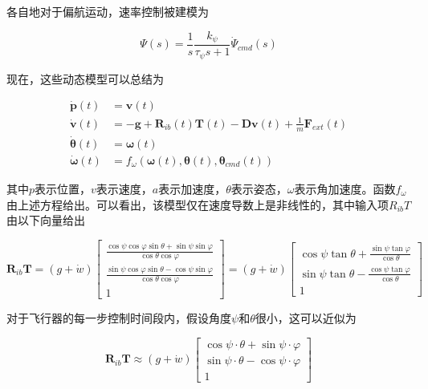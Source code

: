 各自地对于偏航运动，速率控制被建模为

\begin{equation}
\Psi(s)=\frac{1}{s} \frac{k_{\psi}}{\tau_{\psi} s+1} \dot{\Psi}_{c m d}(s)
\end{equation}

现在，这些动态模型可以总结为

\begin{equation}
\begin{aligned}
\dot{\boldsymbol{p}}(t) &=\boldsymbol{v}(t) \\
\dot{\boldsymbol{v}}(t) &=-\boldsymbol{g}+\boldsymbol{R}_{i b}(t) \boldsymbol{T}(t)-\boldsymbol{D} \boldsymbol{v}(t)+\frac{1}{m} \boldsymbol{F}_{e x t}(t) \\
\dot{\boldsymbol{\theta}}(t) &=\boldsymbol{\omega}(t) \\
\dot{\boldsymbol{\omega}}(t) &=f_{\omega}\left(\boldsymbol{\omega}(t), \boldsymbol{\theta}(t), \boldsymbol{\theta}_{c m d}(t)\right)
\end{aligned}
\end{equation}

其中$p$表示位置，$v$表示速度，$a$表示加速度，$\theta$表示姿态，$\omega$表示角加速度。函数$f_{\omega}$由上述方程给出。可以看出，该模型仅在速度导数上是非线性的，其中输入项$R_{ib}T$由以下向量给出

\begin{equation}
\boldsymbol{R}_{i b} \boldsymbol{T}=(g+\dot{w})\left[\begin{array}{c}
\frac{\cos \psi \cos \varphi \sin \theta+\sin \psi \sin \varphi}{\cos \theta \cos \varphi} \\
\frac{\sin \psi \cos \varphi \sin \theta-\cos \psi \sin \varphi}{\cos \theta \cos \varphi} \\
1
\end{array}\right]=(g+\dot{w})\left[\begin{array}{c}
\cos \psi \tan \theta+\frac{\sin \psi \tan \varphi}{\cos \theta} \\
\sin \psi \tan \theta-\frac{\cos \psi \tan \varphi}{\cos \theta} \\
1
\end{array}\right]
\end{equation}

对于飞行器的每一步控制时间段内，假设角度$\psi$和$\theta$很小，这可以近似为

\begin{equation}
\boldsymbol{R}_{i b} \boldsymbol{T} \approx(g+\dot{w})\left[\begin{array}{c}
\cos \psi \cdot \theta+\sin \psi \cdot \varphi \\
\sin \psi \cdot \theta-\cos \psi \cdot \varphi \\
1
\end{array}\right]
\end{equation}

